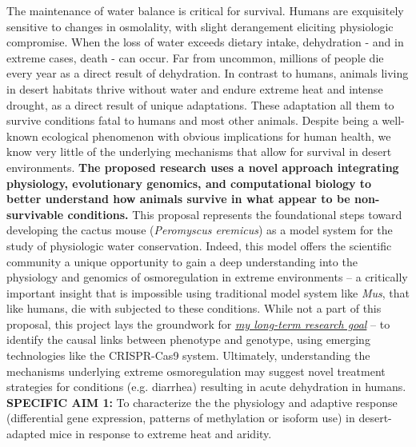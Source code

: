 \documentclass[11pt]{article}
\begin{document}
\setlength{\parindent}{1cm}
\setcounter{page}{0}



\pagestyle{fancy}
\setcounter{page}{1}

The maintenance of water balance is critical for survival. Humans are exquisitely sensitive to changes in osmolality, with slight derangement eliciting physiologic compromise. When the loss of water exceeds dietary intake, dehydration - and in extreme cases, death - can occur. Far from uncommon, millions of people die every year as a direct result of dehydration. In contrast to humans, animals living in desert habitats thrive without water and endure extreme heat and intense drought, as a direct result of unique adaptations. These adaptation all them to survive conditions fatal to humans and most other animals. Despite being a well-known ecological phenomenon with obvious implications for human health, we know very little of the underlying mechanisms that allow for survival in desert environments. \textbf{The proposed research uses a novel approach integrating physiology, evolutionary genomics, and computational biology to better understand how animals survive in what appear to be non-survivable conditions.} This proposal represents the foundational steps toward developing the cactus mouse (\textit{Peromyscus eremicus}) as a model system for the study of physiologic water conservation. Indeed, this model offers the scientific community a unique opportunity to gain a deep understanding into the physiology and genomics of osmoregulation in extreme environments – a critically important insight that is impossible using traditional model system like \textit{Mus}, that like humans, die with subjected to these conditions. While not a part of this proposal, this project lays the groundwork for \ul{\emph{my long-term research goal}} – to identify the causal links between phenotype and genotype, using emerging technologies like the CRISPR-Cas9 system. Ultimately, understanding the mechanisms underlying extreme osmoregulation may suggest novel treatment strategies for conditions (e.g. diarrhea) resulting in acute dehydration in humans.\\

\noindent \textbf{SPECIFIC AIM 1:} To characterize the the physiology and adaptive response (differential gene expression, patterns of methylation or isoform use) in desert-adapted mice in response to extreme heat and aridity.  
\end{document}
